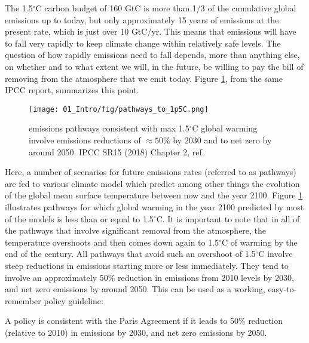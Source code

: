 The 1.5$^\circ$C carbon budget of 160 GtC is more than 1/3 of the cumulative global emissions up to today, but only approximately 15 years of emissions at the present rate, which is just over 10 GtC/yr\cite{LeQuere2018}. This means that emissions will have to fall very rapidly to keep climate change within relatively safe levels. The question of how rapidly emissions need to fall depends, more than anything else, on whether and to what extent we will, in the future, be willing to pay the bill of removing  from the atmosphere that we emit today. Figure \ref{fig:paths}, from the same IPCC report, summarizes this point. 
\begin{figure}[h!]
	\centering
	\texttt{[image: 01\_Intro/fig/pathways\_to\_1p5C.png]}
	\caption{ emissions pathways consistent with max 1.5$^\circ$C global warming involve emissions reductions of $\approx 50$\% by 2030 and to net zero by around 2050. IPCC SR15 (2018) Chapter 2, ref. \cite{IPCC2018_ch2}}
	\label{fig:paths}
\end{figure}

Here, a number of scenarios for future emissions rates (referred to as pathways) are fed to various climate model which predict among other things the evolution of the global mean surface temperature between now and the year 2100. Figure \ref{fig:paths} illustrates pathways for which global warming in the year 2100 predicted by most of the models is less than or equal to 1.5$^\circ$C. It is important to note that in all of the pathways that involve significant  removal from the atmosphere, the temperature overshoots and then comes down again to 1.5$^\circ$C of warming by the end of the century. All pathways that avoid such an overshoot of 1.5$^\circ$C involve steep reductions in emissions starting more or less immediately. They tend to involve an approximately 50\% reduction in  emissions from 2010 levels by 2030, and net zero emissions by around 2050\cite{IPCC2018_ch2}. This can be used as a working, easy-to-remember policy guideline:
\begin{definition}
A policy is consistent with the Paris Agreement if it leads to 50\% reduction (relative to 2010) in  emissions by 2030, and net zero emissions by 2050. \label{d:Paris}
\end{definition}

